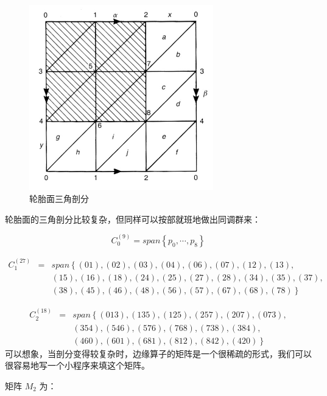 \documentclass[UTF8]{ctexart}
\begin{document}
\begin{figure}[H]
\begin{centering}
\includegraphics[width=8cm]{include/f2}
\par\end{centering}
\caption{轮胎面三角剖分}
\end{figure}
\noindent
轮胎面的三角剖分比较复杂，但同样可以按部就班地做出同调群来：

\begin{equation}
C_{0}^{(9)}=span\left\{ p_{0},\cdots,p_{8}\right\} 
\end{equation}

\begin{eqnarray}
C_{1}^{(27)} & = & span\left\{ (01),(02),(03),(04),(06),(07),(12),(13),\right.\nonumber \\
 &  & (15),(16),(18),(24),(25),(27),(28),(34),(35),(37),\nonumber \\
 &  & \left.(38),(45),(46),(48),(56),(57),(67),(68),(78)\right\} 
\end{eqnarray}

\begin{eqnarray}
C_{2}^{(18)} & = & span\left\{ (013),(135),(125),(257),(207),(073),\right.\nonumber \\
 &  & (354),(546),(576),(768),(738),(384),\nonumber \\
 &  & \left.(460),(601),(681),(812),(842),(420)\right\} 
\end{eqnarray}
可以想象，当剖分变得较复杂时，边缘算子的矩阵是一个很稀疏的形式，我们可以很容易地写一个小程序来填这个矩阵。

矩阵 $M_{2}$ 为：
\end{document}
